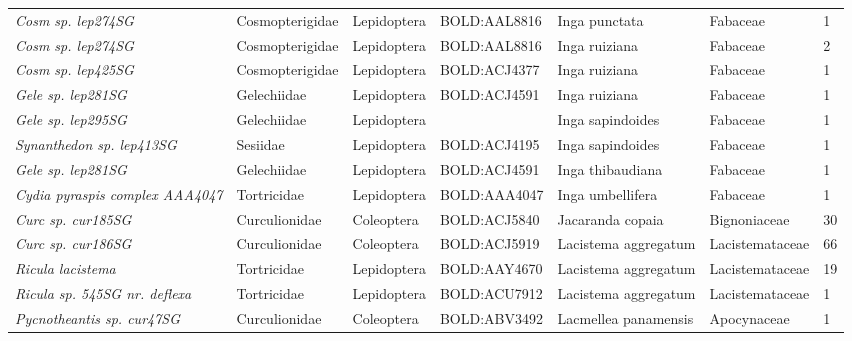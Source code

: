 \documentclass[11pt]{article}
\begin{document}
\begin{landscape}
\begin{longtable}{@{}lllllll@{}}
\textit{Cosm sp. lep274SG}                            & Cosmopterigidae & Lepidoptera  & BOLD:AAL8816 & Inga punctata                      & Fabaceae         & 1     \\
\textit{Cosm sp. lep274SG}                            & Cosmopterigidae & Lepidoptera  & BOLD:AAL8816 & Inga ruiziana                      & Fabaceae         & 2     \\
\textit{Cosm sp. lep425SG}                            & Cosmopterigidae & Lepidoptera  & BOLD:ACJ4377 & Inga ruiziana                      & Fabaceae         & 1     \\
\textit{Gele sp. lep281SG}                            & Gelechiidae     & Lepidoptera  & BOLD:ACJ4591 & Inga ruiziana                      & Fabaceae         & 1     \\
\textit{Gele sp. lep295SG}                            & Gelechiidae     & Lepidoptera  &              & Inga sapindoides                   & Fabaceae         & 1     \\
\textit{Synanthedon sp. lep413SG}                     & Sesiidae        & Lepidoptera  & BOLD:ACJ4195 & Inga sapindoides                   & Fabaceae         & 1     \\
\textit{Gele sp. lep281SG}                            & Gelechiidae     & Lepidoptera  & BOLD:ACJ4591 & Inga thibaudiana                   & Fabaceae         & 1     \\
\textit{Cydia pyraspis complex AAA4047}               & Tortricidae     & Lepidoptera  & BOLD:AAA4047 & Inga umbellifera                   & Fabaceae         & 1     \\
\textit{Curc sp. cur185SG}                            & Curculionidae   & Coleoptera   & BOLD:ACJ5840 & Jacaranda copaia                   & Bignoniaceae     & 30    \\
\textit{Curc sp. cur186SG}                            & Curculionidae   & Coleoptera   & BOLD:ACJ5919 & Lacistema aggregatum               & Lacistemataceae  & 66    \\
\textit{Ricula lacistema}                             & Tortricidae     & Lepidoptera  & BOLD:AAY4670 & Lacistema aggregatum               & Lacistemataceae  & 19    \\
\textit{Ricula sp. 545SG nr. deflexa}                 & Tortricidae     & Lepidoptera  & BOLD:ACU7912 & Lacistema aggregatum               & Lacistemataceae  & 1     \\
\textit{Pycnotheantis sp. cur47SG}                    & Curculionidae   & Coleoptera   & BOLD:ABV3492 & Lacmellea panamensis               & Apocynaceae      & 1     \\

\end{longtable}
\end{landscape}
\end{document}
